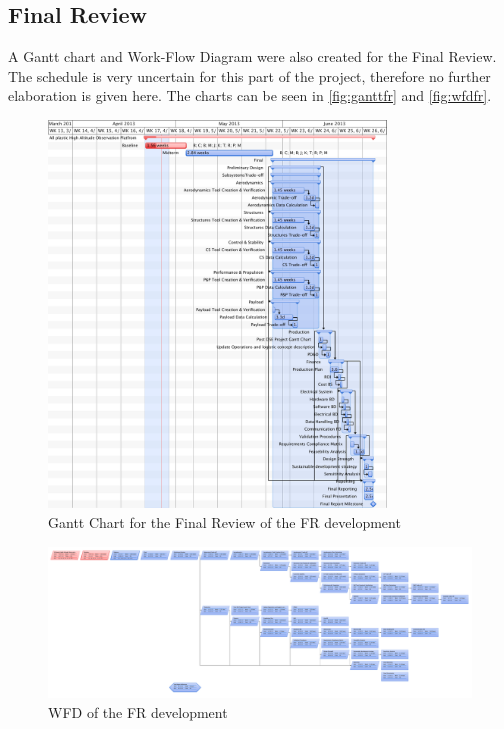 \documentclass[a4paper]{report}
\begin{document}
\subsection{Final Review}
A Gantt chart and Work-Flow Diagram were also created for the Final Review. The schedule is very uncertain for this part of the project, therefore no further elaboration is given here. The charts can be seen in \autoref{fig:ganttfr} and \autoref{fig:wfdfr}.
\begin{figure}[h]
	\centering
	
	\includegraphics[width=0.8\textwidth]{Figures/FINALGANTT.pdf}
	\caption{Gantt Chart for the Final Review of the FR development}
	\label{fig:ganttfr}
	
\end{figure}
\begin{figure}[H]
	\centering
	
	\includegraphics[width=\textheight, angle=270]{Figures/FINALWFD.pdf}
	\caption{WFD of the FR development}
	\label{fig:wfdfr}
	
\end{figure}
\end{document}
